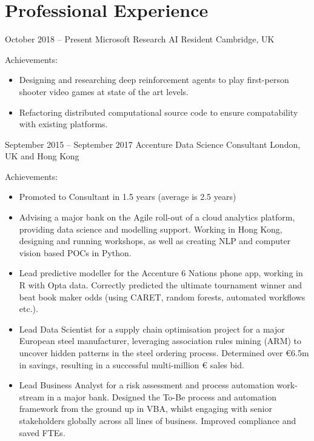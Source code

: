 \documentclass[]{friggeri-cv} %
\begin{document}
\section{Professional Experience}


\begin{entrylist}


\entry
{October 2018 -- Present}
{Microsoft Research}
{AI Resident}
{Cambridge, UK}
{Achievements:
\begin{itemize}
    \item Designing and researching deep reinforcement agents to play first-person shooter video games at state of the art levels.
    \item Refactoring distributed computational source code to ensure compatability with existing platforms.
\end{itemize}
}

\entry
{September 2015 -- September 2017}
{Accenture}
{Data Science Consultant}
{London, UK and Hong Kong}
{Achievements:
\begin{itemize}
    \item Promoted to Consultant in 1.5 years (average is 2.5 years)
    \item Advising a major bank on the Agile roll-out of a cloud analytics platform, providing data
    science and modelling support. Working in Hong Kong, designing and running workshops,
    as well as creating NLP and computer vision based POCs in Python.
    \item Lead predictive modeller for the Accenture 6 Nations phone app, working in R with Opta
    data. Correctly predicted the ultimate tournament winner and beat book maker odds
    (using CARET, random forests, automated workflows etc.).
    \item Lead Data Scientist for a supply chain optimisation project for a major European steel
    manufacturer, leveraging association rules mining (ARM) to uncover hidden patterns in
    the steel ordering process. Determined over €6.5m in savings, resulting in a successful
    multi-million € sales bid.
    \item Lead Business Analyst for a risk assessment and process automation work-stream in a
    major bank. Designed the To-Be process and automation framework from the ground
    up in VBA, whilst engaging with senior stakeholders globally across all lines of business.
    Improved compliance and saved FTEs.
\end{itemize}}






\end{entrylist}
\end{document}
